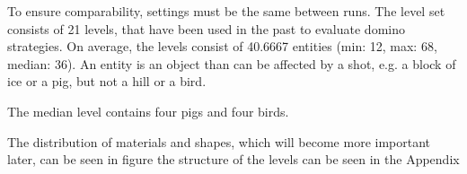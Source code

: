 To ensure comparability, settings must be the same between runs.
The level set consists of 21 levels, that have been used in the past to evaluate domino strategies. On average, the levels consist of 40.6667 entities (min: 12, max: 68, median: 36). An entity is an object than can be affected by a shot, e.g. a block of ice or a pig, but not a hill or a bird.

The median level contains four pigs and four birds.

The distribution of materials and shapes, which will become more important later, can be seen in figure %
the structure of the levels can be seen in the Appendix %